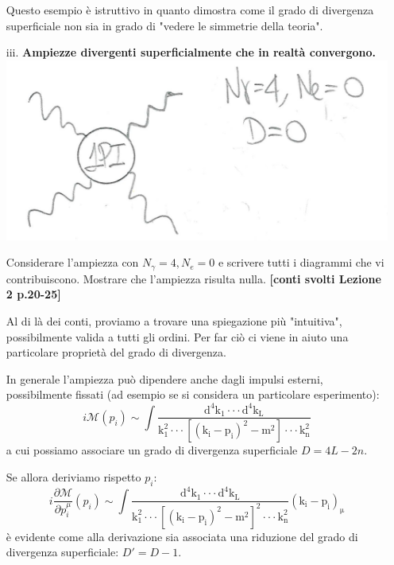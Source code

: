 \documentclass[../main.tex]{subfiles}
\begin{document}
\begin{enumerate}
\begin{nota}
                Questo esempio è istruttivo in quanto dimostra come il grado di divergenza superficiale non sia in grado di "vedere le simmetrie della teoria".
                \label{note:tadpole}
                \end{nota}
            

    \item[iii.] \textbf{Ampiezze divergenti superficialmente che in realtà convergono.}\\ 
                \includegraphics[]{images/Ampiezze_tipo3.jpg}\\
                \begin{exercise}
                    Considerare l'ampiezza con $N_\gamma = 4, N_e = 0$ e scrivere tutti i diagrammi che vi contribuiscono. Mostrare che l'ampiezza risulta nulla. \textbf{[conti svolti Lezione 2 p.20-25]}
                    \label{ex:4phot_ampl}
                \end{exercise}
                Al di là dei conti, proviamo a trovare una spiegazione più "intuitiva", possibilmente valida a tutti gli ordini. Per far ciò ci viene in aiuto una particolare proprietà del grado di divergenza.
                
                In generale l'ampiezza può dipendere anche dagli impulsi esterni, possibilmente fissati (ad esempio se si considera un particolare esperimento):
                \[
                i\mathscr{M}(p_i) \sim \int\mathrm{\frac{d^4k_1 \cdot\cdot\cdot d^4k_L}{k_1^2 \cdot\cdot\cdot [(k_i-p_i)^2-m^2] \cdot\cdot\cdot k_n^2}}
                \]
                a cui possiamo associare un grado di divergenza superficiale $D=4L-2n$.
                
                Se allora deriviamo rispetto $p_i$:
                \[
                i\frac{\partial\mathscr{M}}{\partial p_i^\mu}(p_i) \sim \int\mathrm{\frac{d^4k_1 \cdot\cdot\cdot d^4k_L}{k_1^2 \cdot\cdot\cdot [(k_i-p_i)^2-m^2]^2 \cdot\cdot\cdot k_n^2}(k_i-p_i)_\mu}
                \]
                è evidente come alla derivazione sia associata una riduzione del grado di divergenza superficiale: $D' = D - 1$.


\end{enumerate}
\end{document}
